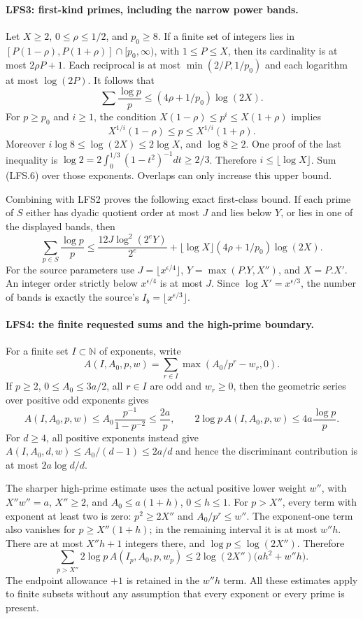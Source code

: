 \paragraph{LFS3: first-kind primes, including the narrow power bands.}
\label{claim:LFS3}
Let $X\ge2$, $0\le\rho\le1/2$, and $p_0\ge8$.
If a finite set of integers lies in
$[P(1-\rho),P(1+\rho)]\cap[p_0,\infty)$, with $1\le P\le X$,
then its cardinality is at most $2\rho P+1$.  Each reciprocal is
at most $\min(2/P,1/p_0)$ and each logarithm at most $\log(2P)$.
It follows that
\[
 \sum \frac{\log p}{p}
 \le (4\rho+1/p_0)\log(2X).                            \tag{LFS.6}
\]
For $p\ge p_0$ and $i\ge1$, the condition
$X(1-\rho)\le p^i\le X(1+\rho)$ implies
\[
 X^{1/i}(1-\rho)\le p\le X^{1/i}(1+\rho).
\]
Moreover $i\log8\le\log(2X)\le2\log X$, and
$\log8\ge2$.  One proof of the last inequality is
$\log2=2\int_0^{1/3}(1-t^2)^{-1}dt\ge2/3$.
Therefore $i\le\lfloor\log X\rfloor$.
Sum (LFS.6) over those exponents.  Overlaps can only increase this
upper bound.

Combining with LFS2 proves the following exact first-class bound.
If each prime of $S$ either has dyadic quotient order at most $J$
and lies below $Y$, or lies in one of the displayed bands, then
\[
 \sum_{p\in S}\frac{\log p}{p}
 \le\frac{12J\log^2(2^eY)}{2^e}
  +\lfloor\log X\rfloor(4\rho+1/p_0)\log(2X).          \tag{LFS.7}
\]
For the source parameters use
$J=\lfloor x^{\epsilon/4}\rfloor$,
$Y=\max(P.Y,X'')$, and $X=P.X'$.
An integer order strictly below $x^{\epsilon/4}$ is at most $J$.
Since $\log X'=x^{\epsilon/3}$, the number of bands is exactly
the source's $I_b=\lfloor x^{\epsilon/3}\rfloor$.

\paragraph{LFS4: the finite requested sums and the high-prime boundary.}
\label{claim:LFS4}
For a finite set $I\subset\mathbb N$ of exponents, write
\[
 A(I,A_0,p,w)=\sum_{r\in I}\max(A_0/p^r-w_r,0).
\]
If $p\ge2$, $0\le A_0\le3a/2$, all $r\in I$ are odd and
$w_r\ge0$, then the geometric series over positive odd exponents
gives
\[
 A(I,A_0,p,w)\le A_0\frac{p^{-1}}{1-p^{-2}}
 \le\frac{2a}{p},\qquad
 2\log p\,A(I,A_0,p,w)\le4a\frac{\log p}{p}.           \tag{LFS.8}
\]
For $d\ge4$, all positive exponents instead give
$A(I,A_0,d,w)\le A_0/(d-1)\le2a/d$ and hence the
discriminant contribution is at most $2a\log d/d$.

The sharper high-prime estimate uses the actual positive lower
weight $w''$, with $X''w''=a$, $X''\ge2$, and
$A_0\le a(1+h)$, $0\le h\le1$.
For $p>X''$, every term with exponent at least two is zero:
$p^2\ge2X''$ and $A_0/p^r\le w''$.  The exponent-one term
also vanishes for $p\ge X''(1+h)$; in the remaining interval it
is at most $w''h$.  There are at most $X''h+1$ integers there,
and $\log p\le\log(2X'')$.  Therefore
\[
 \sum_{p>X''}2\log p\,A(I_p,A_0,p,w_p)
 \le2\log(2X'')\bigl(ah^2+w''h\bigr).                 \tag{LFS.9}
\]
The endpoint allowance $+1$ is retained in the $w''h$ term.
All these estimates apply to finite subsets without any assumption
that every exponent or every prime is present.

